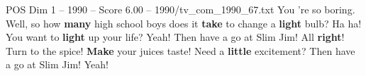 \begin{textsample}{POS Dim 1 – 1990 – Score 6.00 – 1990/tv\_com\_1990\_67.txt}  \label{ex:f1_pos_052}
You 're so boring.
Well, so how \textbf{many} high school boys does it \textbf{take} to change a \textbf{light} bulb?
Ha ha!
You want to \textbf{light} up your life?
Yeah!
Then have a go at Slim Jim!
All \textbf{right}!
Turn to the spice! \textbf{Make} your juices taste!
Need a \textbf{little} excitement?
Then have a go at Slim Jim!
Yeah!

\end{textsample}
